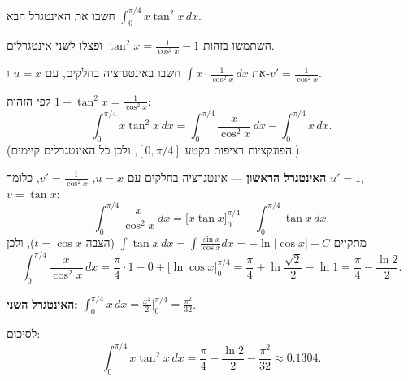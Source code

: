 
\begin{question}
חשבו את האינטגרל הבא $\displaystyle\int_0^{\pi/4} x\tan^2 x\,dx$.
\end{question}

\begin{hint}
השתמשו בזהות $\tan^2 x = \frac{1}{\cos^2 x}-1$ ופצלו לשני אינטגרלים.
\end{hint}

\begin{hint}
את $\int x\cdot\frac{1}{\cos^2 x}\,dx$ חשבו באינטגרציה בחלקים, עם $u=x$ ו-$v'=\frac{1}{\cos^2x}$.
\end{hint}

\begin{solution}
לפי הזהות $1+\tan^2 x = \frac{1}{\cos^2 x}$:
\[ \int_0^{\pi/4} x\tan^2 x\,dx = \int_0^{\pi/4} \frac{x}{\cos^2 x}\,dx - \int_0^{\pi/4} x\,dx. \]
(הפונקציות רציפות בקטע $[0,\pi/4]$, ולכן כל האינטגרלים קיימים.)

\textbf{האינטגרל הראשון} — אינטגרציה בחלקים עם $u=x$, $v'=\frac{1}{\cos^2x}$, כלומר $u'=1$, $v=\tan x$:
\[ \int_0^{\pi/4}\frac{x}{\cos^2x}\,dx = \Big[x\tan x\Big]_0^{\pi/4} - \int_0^{\pi/4}\tan x\,dx. \]
מתקיים $\int \tan x\,dx = \int\frac{\sin x}{\cos x}dx = -\ln|\cos x|+C$ (הצבה $t=\cos x$), ולכן
\[ \int_0^{\pi/4}\frac{x}{\cos^2x}\,dx = \frac{\pi}{4}\cdot 1 - 0 + \Big[\ln\cos x\Big]_0^{\pi/4} = \frac{\pi}{4} + \ln\frac{\sqrt2}{2} - \ln 1 = \frac{\pi}{4} - \frac{\ln 2}{2}. \]

\textbf{האינטגרל השני:} $\displaystyle\int_0^{\pi/4}x\,dx = \frac{x^2}{2}\Big|_0^{\pi/4} = \frac{\pi^2}{32}$.

לסיכום:
\[ \int_0^{\pi/4} x\tan^2 x\,dx = \frac{\pi}{4} - \frac{\ln 2}{2} - \frac{\pi^2}{32} \approx 0.1304. \]
\end{solution}

